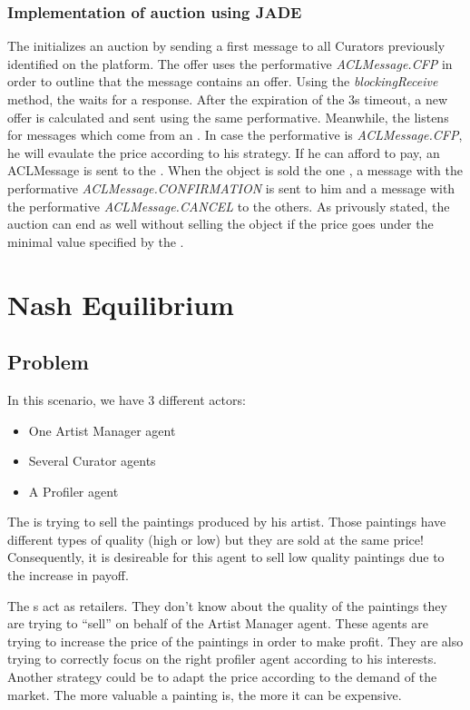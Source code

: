 \documentclass[a4paper,11pt]{article}
\begin{document}
  
  
  \subsubsection{Implementation of auction using JADE}
  
  The \am{} initializes an auction by sending a first message to all Curators previously identified 
  on the platform. The offer uses the performative \textit{ACLMessage.CFP} in order to outline that 
  the message contains an offer. Using the \textit{blockingReceive} method, the \am{} waits for a response. 
  After the expiration of the 3s timeout, a new offer is calculated and sent using the same performative. 
  Meanwhile, the \cu{} listens for messages which come from an \am{}. In case the performative is 
  \textit{ACLMessage.CFP}, he will evaulate the price according to his strategy. If he can afford to 
  pay, an ACLMessage is sent to the \am{}. When the object is sold the one \cu{}, a message with the 
  performative \textit{ACLMessage.CONFIRMATION} is sent to him and a message with the performative 
  \textit{ACLMessage.CANCEL} to the others. As privously stated, the auction can end as
  well without selling the object if the price goes under the minimal value specified by the \am{}.

  \section{Nash Equilibrium}
  
  \subsection{Problem}

  In this scenario, we have 3 different actors:
  \begin{itemize}
   \item One Artist Manager agent
   \item Several Curator agents
   \item A Profiler agent
  \end{itemize}
  
  The \am{} is trying to sell the paintings produced by his artist. Those paintings have 
  different types of quality (high or low) but they are sold at the same price! Consequently, it is desireable 
  for this agent to sell low quality paintings due to the increase in payoff.
  
  The \cu{}s act as retailers. They don't know about the quality of the paintings 
  they are trying to ``sell'' on behalf of the Artist Manager agent. These agents are 
  trying to increase the price of the paintings in order to make profit. They are also trying to 
  correctly focus on the right profiler agent according to his interests. Another strategy could 
  be to adapt the price according to the demand of the market. The more valuable a painting is, 
  the more it can be expensive.
  
\end{document}
